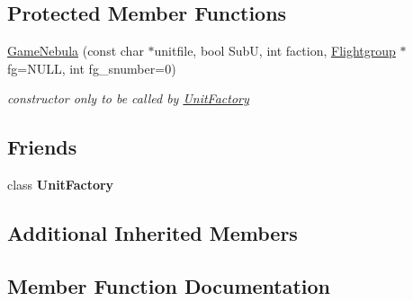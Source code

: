 \subsection*{Protected Member Functions}
\begin{DoxyCompactItemize}
\item 
\hyperlink{classGameNebula_a32ef4fc24cf332b2b9564fd9d5348e5e}{Game\+Nebula} (const char $\ast$unitfile, bool SubU, int faction, \hyperlink{classFlightgroup}{Flightgroup} $\ast$fg=N\+U\+LL, int fg\+\_\+snumber=0)\hypertarget{classGameNebula_a32ef4fc24cf332b2b9564fd9d5348e5e}{}\label{classGameNebula_a32ef4fc24cf332b2b9564fd9d5348e5e}

\begin{DoxyCompactList}\small\item\em constructor only to be called by \hyperlink{classUnitFactory}{Unit\+Factory} \end{DoxyCompactList}\end{DoxyCompactItemize}
\subsection*{Friends}
\begin{DoxyCompactItemize}
\item 
class {\bfseries Unit\+Factory}\hypertarget{classGameNebula_a187c66d2d867f6265d3b0c99ffc34838}{}\label{classGameNebula_a187c66d2d867f6265d3b0c99ffc34838}

\end{DoxyCompactItemize}
\subsection*{Additional Inherited Members}


\subsection{Member Function Documentation}
